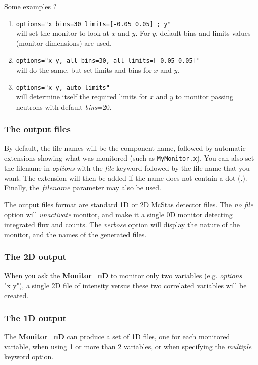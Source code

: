 Some examples ?
\begin{enumerate}
\item{\texttt{options="x bins=30 limits=[-0.05 0.05] ; y"} \\
    will set the monitor to look at $x$ and $y$. For $y$, default bins
    and limits values (monitor dimensions) are used.}
\item{\texttt{options="x y, all bins=30, all limits=[-0.05 0.05]"} \\
    will do the same, but set limits and bins for $x$ and $y$.}
\item{\texttt{options="x y, auto limits"} \\
    will determine itself the required limits for $x$ and $y$ to monitor
    passing neutrons with default {\it bins}=20.}
\end{enumerate}

\subsubsection{The output files}

By default, the file names will be the component name, followed by
automatic extensions showing what was monitored (such as
\texttt{MyMonitor.x}). You can also set the filename in {\it options}
with the {\it file} keyword followed by the file name that you want. The
extension will then be added if the name does not contain a dot (.).
Finally, the $filename$ parameter may also be used.

The output files format are standard 1D or 2D McStas detector files.
The {\it no file} option will {\it unactivate} monitor, and make it a
single 0D monitor detecting integrated flux and counts.
The {\it verbose} option will display the nature of the monitor, and the
names of the generated files.

\subsubsection{The 2D output}

When you ask the {\bf Monitor\_nD} to monitor only two variables (e.g.
{\it options} = "x y"), a single 2D file of intensity versus these two
correlated variables will be created.

\subsubsection{The 1D output}

The {\bf Monitor\_nD} can produce a set of 1D files, one for each
monitored variable, when using 1 or more than 2 variables, or when
specifying the {\it multiple} keyword option.


